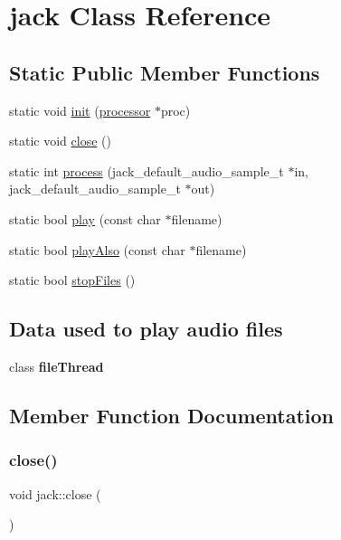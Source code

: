 \hypertarget{classjack}{}\section{jack Class Reference}
\label{classjack}
\subsection*{Static Public Member Functions}
\begin{DoxyCompactItemize}
\item 
static void \hyperlink{classjack_adcd812fb47ff7c7081208fc7b5f65e89}{init} (\hyperlink{classprocessor}{processor} $\ast$proc)
\item 
static void \hyperlink{classjack_ac0c163234845cd6b171156395f28dd6f}{close} ()
\item 
static int \hyperlink{classjack_a2af30016c4bad33ebfc9ba7d2db4451a}{process} (jack\+\_\+default\+\_\+audio\+\_\+sample\+\_\+t $\ast$in, jack\+\_\+default\+\_\+audio\+\_\+sample\+\_\+t $\ast$out)
\item 
static bool \hyperlink{classjack_a4871a8263be867ba8ffbb5f81a19b547}{play} (const char $\ast$filename)
\item 
static bool \hyperlink{classjack_a59ee9050b7aaa73ca252606818dc767d}{play\+Also} (const char $\ast$filename)
\item 
static bool \hyperlink{classjack_a9b41aab061c8ce636b45c7e82212ed5c}{stop\+Files} ()
\end{DoxyCompactItemize}
\subsection*{Data used to play audio files}
\begin{DoxyCompactItemize}
\item 
\mbox{\label{classjack_aea7ef5bc7b78cf5edb3ba0b8a3ad87da}} 
class {\bfseries file\+Thread}
\end{DoxyCompactItemize}


\subsection{Member Function Documentation}
\mbox{\label{classjack_ac0c163234845cd6b171156395f28dd6f}} 
\subsubsection{\texorpdfstring{close()}{close()}}
{\footnotesize\ttfamily void jack\+::close (\begin{DoxyParamCaption}{ }\end{DoxyParamCaption})\hspace{0.3cm}{\ttfamily [static]}}

